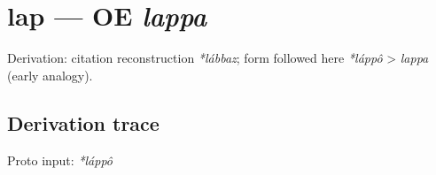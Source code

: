 \documentclass[
  british,
  a4paper,
  openany]{book}
\providecommand{\texorpdfstring}[2]{#1}
\begin{document}
\section{\texorpdfstring{lap --- OE
\emph{lappa}}{lap --- OE lappa}}\label{lap-oe-lappa}


Derivation: citation reconstruction \emph{*lábbaz}; form followed here
\emph{*láppô} \textgreater{} \emph{lappa} (early analogy).

\subsection{Derivation trace}\label{derivation-trace-85}

Proto input: \emph{*láppô}

\begingroup
\setlength{\fboxsep}{6pt}
\end{document}
